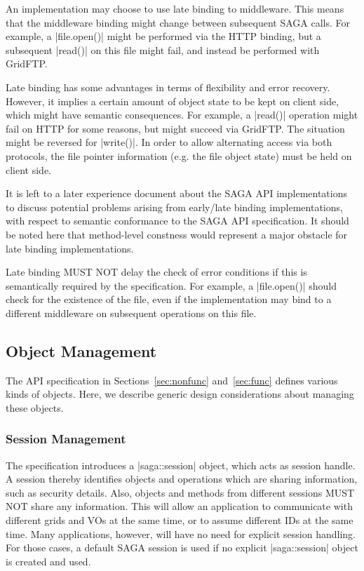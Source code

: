    An implementation may choose to use late binding to
   middleware.  This means that the middleware binding might
   change between subsequent SAGA calls.  For example, a
   |file.open()| might be performed via the HTTP binding, but a
   subsequent |read()| on this file might fail, and instead
   be performed with GridFTP.
   
   Late binding has some advantages in terms of flexibility and
   error recovery.  However, it implies a certain amount of
   object state to be kept on client side, which might have
   semantic consequences.  For example, a |read()| operation
   might fail on HTTP for some reasons, but might succeed via
   GridFTP.  The situation might be reversed for |write()|.  In
   order to allow alternating access via both protocols, the
   file pointer information (e.g. the file object state) must be
   held on client side.
   
   It is left to a later experience document about the SAGA API
   implementations to discuss potential problems arising from
   early/late binding implementations, with respect to semantic
   conformance to the SAGA API specification.  It should be
   noted here that method-level constness would represent a
   major obstacle for late binding implementations.

   Late binding MUST NOT delay the check of error conditions if
   this is semantically required by the specification.  For
   example, a |file.open()| should check for the existence
   of the file, even if the implementation may bind to a
   different middleware on subsequent operations on this file.



 \subsection{Object Management}

 The API specification in Sections~\ref{sec:nonfunc}
 and~\ref{sec:func} defines various kinds of objects.  Here, we
 describe generic design considerations about managing these objects.

  \subsubsection{Session Management}

   The specification introduces a |saga::session| object, which
   acts as session handle.  A session thereby identifies objects
   and operations which are sharing information, such as
   security details.  Also, objects and methods from
   different sessions MUST
   NOT share any information.   This will allow an
   application to communicate with different grids and
   VOs at the same time, or to assume different IDs at the same
   time.  Many applications, however, will have no need for
   explicit session handling. For those cases, a default SAGA
   session is used if no explicit |saga::session| object is
   created and used.

